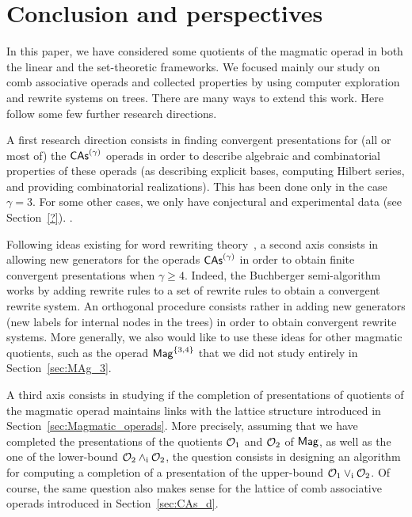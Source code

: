 \section*{Conclusion and perspectives}
In this paper, we have considered some quotients of the magmatic operad
in both the linear and the set-theoretic frameworks. We focused mainly
our study on comb associative operads and collected properties by
using computer exploration and rewrite systems on trees. There are many
ways to extend this work. Here follow some few further research
directions.
\medbreak

A first research direction consists in finding convergent presentations
for (all or most of) the $\mathsf{CAs}^{\left(\gamma\right)}$ operads in
order to describe algebraic and combinatorial properties of these
operads (as describing explicit bases, computing Hilbert
series, and providing combinatorial realizations). This has been
done only in the case $\gamma = 3$. For some other cases, we only have
conjectural and experimental data (see Section~\ref{?}).
.
\medbreak

Following ideas existing for word rewriting theory~\cite{GGM15}, a
second axis consists in allowing new generators for the operads
$\mathsf{CAs}^{\left(\gamma\right)}$ in order to obtain finite convergent presentations
when $\gamma \geq 4$. Indeed, the Buchberger semi-algorithm works by
adding rewrite rules to a set of rewrite rules to obtain a convergent
rewrite system. An orthogonal procedure consists rather in adding new
generators (new labels for internal nodes in the trees) in order to
obtain convergent rewrite systems. More generally, we also would like to
use these ideas for other magmatic quotients, such as the operad
$\mathsf{Mag}^{\{3, 4\}}$ that we did not study entirely in
Section~\ref{sec:MAg_3}.
\medbreak

A third axis consists in studying if the completion of presentations of
quotients of the magmatic operad maintains links with
the lattice structure introduced in Section~\ref{sec:Magmatic_operads}.
More precisely, assuming that we have completed the presentations of
the quotients $\mathcal{O}_1$ and $\mathcal{O}_2$ of $\mathsf{Mag}$,
as well as the one of the lower-bound $\mathcal{O}_2 \wedge_{\mathrm{i}} \mathcal{O}_2$, the
question consists in designing an algorithm for computing a completion
of a presentation of the upper-bound
$\mathcal{O}_1 \vee_{\mathrm{i}} \mathcal{O}_2$. Of course, the same question also makes sense
for the lattice of comb associative operads introduced in
Section~\ref{sec:CAs_d}.
\medbreak

